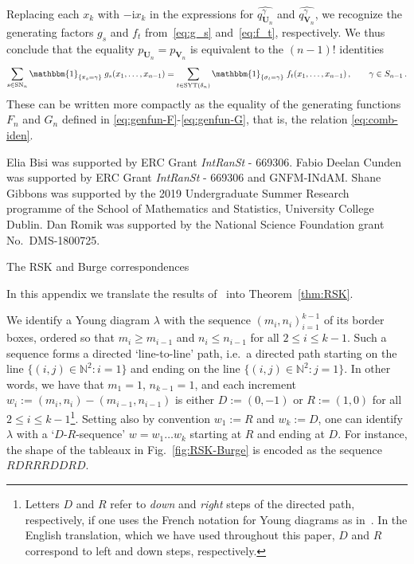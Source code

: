 \documentclass[a4paper,reqno,12pt]{amsart}
\makeatletter
\theoremstyle{plain}
\theoremstyle{definition}
\renewcommand\section{\@startsection{section}{1}%
\z@{.7\linespacing\@plus\linespacing}{.5\linespacing}%
{\large\bfseries\scshape\centering}}
\newcommand{\N}{\mathbb{N}}
\newcommand{\syt}{\textnormal{SYT}}
\newcommand{\staircase}{\delta}
\newcommand{\sort}{\textnormal{SN}}
\renewcommand{\i}{\mathrm{i}}
\newcommand{\1}{\mathbbm{1}}
\renewcommand{\hat}{\widehat}
\makeatother
\begin{document}
Replacing each $x_k$ with $-\i x_k$ in the expressions for $\hat{q_{\bm{U}_n}^{\gamma}}$ and $\hat{q_{\bm{V}_n}^{\gamma}}$, we recognize the generating factors $g_s$ and $f_t$ from~\eqref{eq:g_s} and~\eqref{eq:f_t}, respectively.
We thus conclude that the equality $p_{\bm{U}_n}=p_{\bm{V}_n}$ is equivalent to the $(n-1)!$ identities
\[
\sum_{s \in \sort_n} \1_{\{\pi_s=\gamma\}}\;g_s(x_1,\ldots,x_{n-1})=
\sum_{t \in \syt(\staircase_n)} \1_{\{\sigma_t=\gamma\}}\;f_t(x_1,\ldots,x_{n-1})\, ,\qquad \gamma\in S_{n-1} \, .
\]
These can be written more compactly as the equality of the generating functions $F_n$ and $G_n$ defined in \eqref{eq:genfun-F}-\eqref{eq:genfun-G}, that is, the relation \eqref{eq:comb-iden}.

\vskip 4mm

Elia Bisi was supported by ERC Grant \mbox{\emph{IntRanSt}} - 669306.
Fabio Deelan Cunden was supported by ERC Grant \mbox{\emph{IntRanSt}} - 669306 and GNFM-INdAM.
Shane Gibbons was supported by the 2019 Undergraduate Summer Research programme of the School of Mathematics and Statistics, University College Dublin.
Dan Romik was supported by the National Science Foundation grant No.\ DMS-1800725.

\appendix

\section{The RSK and Burge correspondences}
\label{app:RSK_Burge}

In this appendix we translate the results of~\cite{krattenthaler06} into Theorem~\ref{thm:RSK}.

We identify a Young diagram $\lambda$ with the sequence $(m_i,n_i)_{i=1}^{k-1}$ of its border boxes, ordered so that $m_i \geq m_{i-1}$ and $n_i \leq n_{i-1}$ for all $2\leq i\leq k-1$.
Such a sequence forms a directed `line-to-line' path, i.e.\ a directed path starting on the line $\{(i,j)\in\N^2\colon i=1\}$ and ending on the line $\{(i,j)\in\N^2\colon j=1\}$.
In other words, we have that $m_1=1$, $n_{k-1}=1$, and each increment $w_i := (m_i,n_i) -(m_{i-1}, n_{i-1})$ is either $D:=(0,-1)$ or $R:=(1,0)$ for all $2\leq i\leq k-1$\footnote{Letters $D$ and $R$ refer to \emph{down} and \emph{right} steps of the directed path, respectively, if one uses the French notation for Young diagrams as in~\cite{krattenthaler06}.
In the English translation, which we have used throughout this paper, $D$ and $R$ correspond to left and down steps, respectively.}.
Setting also by convention $w_1:=R$ and $w_k:= D$, one can identify $\lambda$ with a `$D$-$R$-sequence' $w=w_1\dots w_k$ starting at $R$ and ending at $D$.
For instance, the shape of the tableaux in Fig.~\ref{fig:RSK-Burge} is encoded as the sequence $RDRRRDDRD$.
\end{document}
